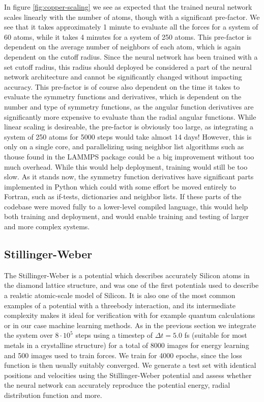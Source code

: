 In figure \ref{fig:copper-scaling} we see as expected that the trained neural network
scales linearly with the number of atoms, though with a significant pre-factor.
We see that it takes approximately 1 minute to evaluate all the forces
for a system of 60 atoms, while it takes 4 minutes for a system of 250 atoms.
This pre-factor is dependent on the average number of neighbors
of each atom, which is again dependent on the cutoff radius.
Since the neural network has been trained with a set cutoff radius,
this radius should deployed be considered a part of the neural network architecture
and cannot be significantly changed without impacting accuracy.
This pre-factor is of course also dependent on the time it takes to evaluate
the symmetry functions and derivatives, which is dependent on the number
and type of symmetry functions, as the angular function derivatives are significantly
more expensive to evaluate than the radial angular functions.
While linear scaling is desireable, the pre-factor is obviously too large,
as integrating a system of 250 atoms for 5000 steps would take almost 14 days!
However, this is only on a single core, and parallelizing using neighbor list algorithms
such as thouse found in the LAMMPS package could be a big improvement without too much overhead.
While this would help deployment, training would still be too slow.
As it stands now, the symmetry function derivatives have significant parts
implemented in Python which could with some effort be moved entirely to Fortran,
such as if-tests, dictionaries and neighbor lists.
If these parts of the codebase were moved fully to a lower-level compiled
language, this would help both training and deployment, and would enable
training and testing of larger and more complex systems.

\subsection{Stillinger-Weber}
The Stillinger-Weber is a potential which describes accurately
Silicon atoms in the diamond lattice structure, and was
one of the first potentials used to describe a realstic atomic-scale
model of Silicon. It is also one of the most common examples
of a potential with a threebody interaction, and its intermediate complexity
makes it ideal for verification with for example quantum calculations
or in our case machine learning methods.
As in the previous section we integrate the system over $8 \cdot 10^5$
steps using a timestep of $\Delta t = 5.0$ fs (suitable for most metals
in a crystalline structure) for a total of 8000 images for energy learning
and 500 images used to train forces. We train for 4000 epochs, since
the loss function is then usually suitably converged.
We generate a test set with identical positions and velocities
using the Stillinger-Weber potential and assess whether the neural network
can accurately reproduce the potential energy, radial distribution function
and more.


